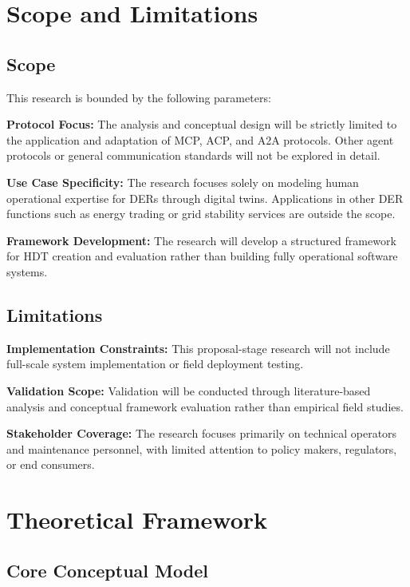\documentclass[12pt,a4paper]{article}
\begin{document}
\section{Scope and Limitations}
\label{sec:scope}

\subsection{Scope}

This research is bounded by the following parameters:

\textbf{Protocol Focus:} The analysis and conceptual design will be strictly limited to the application and adaptation of MCP, ACP, and A2A protocols. Other agent protocols or general communication standards will not be explored in detail.

\textbf{Use Case Specificity:} The research focuses solely on modeling human operational expertise for DERs through digital twins. Applications in other DER functions such as energy trading or grid stability services are outside the scope.

\textbf{Framework Development:} The research will develop a structured framework for HDT creation and evaluation rather than building fully operational software systems.

\subsection{Limitations}

\textbf{Implementation Constraints:} This proposal-stage research will not include full-scale system implementation or field deployment testing.

\textbf{Validation Scope:} Validation will be conducted through literature-based analysis and conceptual framework evaluation rather than empirical field studies.

\textbf{Stakeholder Coverage:} The research focuses primarily on technical operators and maintenance personnel, with limited attention to policy makers, regulators, or end consumers.

\section{Theoretical Framework}
\label{sec:framework}

\subsection{Core Conceptual Model}
\end{document}
